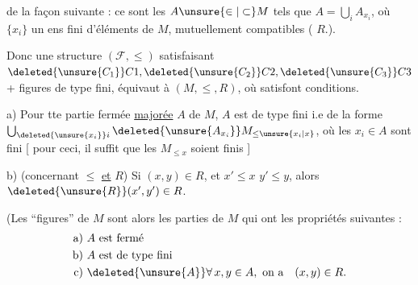 de la façon suivante : ce sont les $A\unsure{\in|\subset}M$ tels que $A=\bigcup_i A_{x_i}$, où  $\{x_i\}$  un ens fini d'éléments de $M$, mutuellement compatibles ( $R$.).

Donc une structure $(\mathcal F,\leq)$ satisfaisant $\deleted{\unsure{C_1}}C1,\deleted{\unsure{C_2}}C2,\deleted{\unsure{C_3}}C3$ + figures  de type fini, équivaut à $(M,\leq,R)$, où   satisfont  conditions.

a)  Pour tte partie fermée \uline{majorée} $A$\deleted{\unsure{,}} de $M$, $A$ est de type fini i.e de la forme $\bigcup_{\deleted{\unsure{x_i}}i}\deleted{\unsure{A_{x_i}}}M_{\leq\unsure{x_i|x}}$, où les $x_i\in A$  sont   fini [ pour ceci, il suffit que les $M_{\leq x}$ soient finis ]


b) (concernant $\leq$ \uline{et} $R$) Si $(x,y)\in R$, et $x'\leq x$ $y'\leq y$, alors $\deleted{\unsure{R}}(x',y')\in R$.


(Les ``figures'' de $M$ sont alors les parties  de $M$ qui ont les propriétés suivantes :
\[
\begin{aligned}
\text{a) } & A\text{ est fermé}\\
\text{b) } & A\text{ est de type fini}\\
\text{c) } & \deleted{\unsure{A}}\forall\,x,y\in A,\ \text{on a}\quad (x,y)\in R.
\end{aligned}
\]
